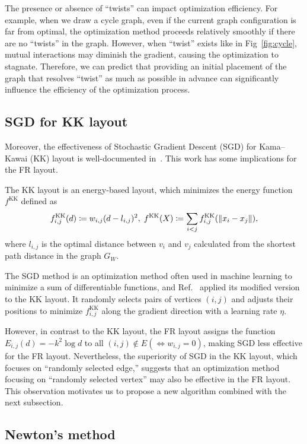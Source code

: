 \documentclass[dvipdfmx,journal]{IEEEtran}
\newcommand{\defeq}{\coloneqq}
\begin{document}
The presence or absence of ``twists'' can impact optimization efficiency.
For example, when we draw a cycle graph, even if the current graph configuration is far from optimal, the optimization method proceeds relatively smoothly if there are no ``twists'' in the graph.
However, when ``twist'' exists like in Fig~\ref{fig:cycle}, mutual interactions may diminish the gradient, causing the optimization to stagnate.
Therefore, we can predict that providing an initial placement of the graph that resolves ``twist'' as much as possible in advance can significantly influence the efficiency of the optimization process.

\subsection{SGD for KK layout}\label{ssec:sgd}

Moreover, the effectiveness of Stochastic Gradient Descent (SGD) for Kama--Kawai (KK) layout is well-documented in~\cite{8419285}. This work has some implications for the FR layout.

The KK layout is an energy-based layout, which minimizes the energy function $f^{\mathrm{KK}}$ defined as
\begin{equation*}
  f^{\mathrm{KK}}_{i,j}(d) \defeq w_{i,j} (d-l_{i,j})^2, \;
  f^{\mathrm{KK}}(X) \defeq \sum_{i<j} f^{\mathrm{KK}}_{i,j}(\norm{x_i - x_j}),
\end{equation*}
where $l_{i,j}$ is the optimal distance between $v_i$ and $v_j$ calculated from the shortest path distance in the graph $G_W$.

The SGD method is an optimization method often used in machine learning to minimize a sum of differentiable functions, and Ref.~\cite{8419285} applied its modified version to the KK layout.
It randomly selects pairs of vertices $(i,j)$ and adjusts their positions to minimize $f^{\mathrm{KK}}_{i,j}$ along the gradient direction with a learning rate $\eta$.

However, in contrast to the KK layout, the FR layout assigns the function $E_{i,j}(d)=-k^2\log{d}$ to all $(i,j) \notin E (\iff w_{i,j}=0)$, making SGD less effective for the FR layout.
Nevertheless, the superiority of SGD in the KK layout, which focuses on ``randomly selected edge,'' suggests that an optimization method focusing on ``randomly selected vertex'' may also be effective in the FR layout.
This observation motivates us to propose a new algorithm combined with the next subsection.

\subsection{Newton's method}\label{ssec:introNewton}
\end{document}
